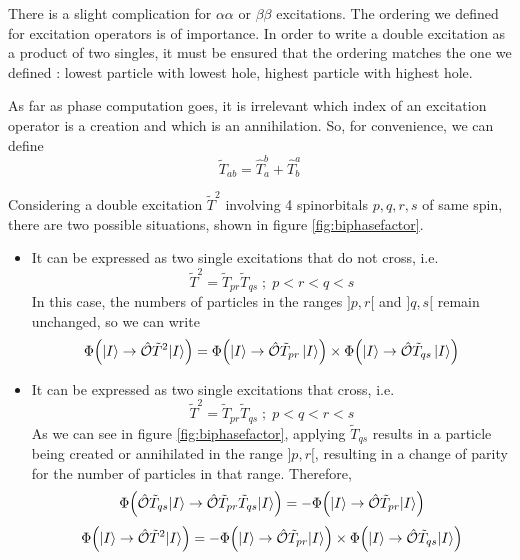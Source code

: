 \documentclass[./thesis.tex]{subfiles}
\begin{document}
There is a slight complication for $\alpha \alpha$ or $\beta \beta$ excitations. The ordering we defined for excitation operators is of importance. In order to write a double excitation as a product of two singles, it must be ensured that the ordering matches the one we defined : lowest particle with lowest hole, highest particle with highest hole.

As far as phase computation goes, it is irrelevant which index of an excitation operator is a creation and which is an annihilation. So, for convenience, we can define
\begin{equation}
\tilde T_{ab} = \hat T_a^b + \hat T_b^a
\end{equation}


Considering a double excitation $\tilde T^2$ involving 4 spinorbitals $p,q,r,s$ of same spin, there are two possible situations, shown in figure \ref{fig:biphasefactor}. 

\begin{itemize}
\item
It can be expressed as two single excitations that do not cross, i.e.
\begin{equation}
\tilde T^2=\tilde T_{pr} \tilde T_{qs} \; ; \; p<r<q<s
\end{equation}
In this case, the numbers of particles in the ranges $]p, r[$ and $]q, s[$ remain unchanged, so we can write
\begin{equation}
{\Phi \qty({\ket{I}}\rightarrow {\hat{\mathcal{O}}}\tilde T^2 {\ket{I}})} =
{\Phi \qty({\ket{I}} \rightarrow {\hat{\mathcal{O}}} \tilde T_{pr} \ket I)} \times
{\Phi \qty({\ket{I}}\rightarrow {\hat{\mathcal{O}}}\tilde T_{qs} \ket I)}
\end{equation}

\item
It can be expressed as two single excitations that cross, i.e.
\begin{equation}
\tilde T^2=\tilde T_{pr} \tilde T_{qs} \; ; \; p<q<r<s
\end{equation}
As we can see in figure \ref{fig:biphasefactor}, applying  $\tilde T_{qs}$ results in a particle being created or annihilated in the range $]p,r[$, resulting in a change of parity for the number of particles in that range. Therefore,
\begin{equation}
{\Phi \qty({\hat{\mathcal{O}}}\tilde T_{qs} {\ket{I}}\rightarrow {\hat{\mathcal{O}}}\tilde T_{pr} \tilde T_{qs} {\ket{I}})} = -{\Phi \qty({\ket{I}} \rightarrow {\hat{\mathcal{O}}} \tilde T_{pr} {\ket{I}})}
\end{equation}
\begin{equation}
{\Phi \qty({\ket{I}}\rightarrow {\hat{\mathcal{O}}}\tilde T^2 {\ket{I}})} = -{\Phi \qty({\ket{I}} \rightarrow {\hat{\mathcal{O}}} \tilde T_{pr} {\ket{I}})} \times {\Phi \qty({\ket{I}}\rightarrow {\hat{\mathcal{O}}}\tilde T_{ qs} {\ket{I}})} 
\end{equation}

\end{itemize}
\end{document}

